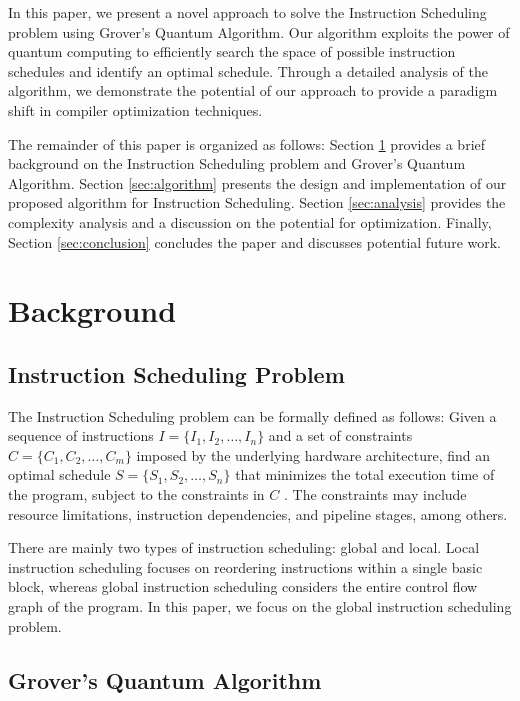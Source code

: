 In this paper, we present a novel approach to solve the Instruction Scheduling problem using Grover's Quantum Algorithm. Our algorithm exploits the power of quantum computing to efficiently search the space of possible instruction schedules and identify an optimal schedule. Through a detailed analysis of the algorithm, we demonstrate the potential of our approach to provide a paradigm shift in compiler optimization techniques.

The remainder of this paper is organized as follows: Section \ref{sec:background} provides a brief background on the Instruction Scheduling problem and Grover's Quantum Algorithm. Section \ref{sec:algorithm} presents the design and implementation of our proposed algorithm for Instruction Scheduling. Section \ref{sec:analysis} provides the complexity analysis and a discussion on the potential for optimization. Finally, Section \ref{sec:conclusion} concludes the paper and discusses potential future work.

\section{Background} \label{sec:background}

\subsection{Instruction Scheduling Problem}

The Instruction Scheduling problem can be formally defined as follows: Given a sequence of instructions $I = \{I_1, I_2, \ldots, I_n\}$ and a set of constraints $C = \{C_1, C_2, \ldots, C_m\}$ imposed by the underlying hardware architecture, find an optimal schedule $S = \{S_1, S_2, \ldots, S_n\}$ that minimizes the total execution time of the program, subject to the constraints in $C$ \cite{gibbons1990instruction}. The constraints may include resource limitations, instruction dependencies, and pipeline stages, among others.

There are mainly two types of instruction scheduling: global and local. Local instruction scheduling focuses on reordering instructions within a single basic block, whereas global instruction scheduling considers the entire control flow graph of the program. In this paper, we focus on the global instruction scheduling problem.

\subsection{Grover's Quantum Algorithm}

